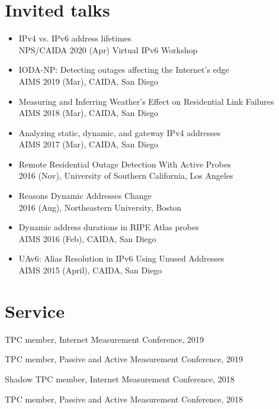 \section*{Invited talks}
\label{sec:talks}
\begin{itemize}
 \setlength\itemsep{0em}

\item IPv4 vs. IPv6 address lifetimes \\
  NPS/CAIDA 2020 (Apr) Virtual IPv6 Workshop \\
 
\item IODA-NP: Detecting outages affecting the Internet's edge \\
  AIMS 2019 (Mar), CAIDA, San Diego \\
  
\item Measuring and Inferring Weather's Effect on Residential Link Failures \\
  AIMS 2018 (Mar), CAIDA, San Diego \\

\item Analyzing static, dynamic, and gateway IPv4 addresses \\
  AIMS 2017 (Mar), CAIDA, San Diego \\

\item Remote Residential Outage Detection With Active Probes \\
2016 (Nov), University of Southern California, Los Angeles \\

\item Reasons Dynamic Addresses Change \\
2016 (Aug), Northeastern University, Boston \\

\item Dynamic address durations in RIPE Atlas probes \\
  AIMS 2016 (Feb), CAIDA, San Diego \\

\item UAv6: Alias Resolution in IPv6 Using Unused Addresses \\
  AIMS 2015 (April), CAIDA, San Diego \\

\end{itemize}


\section*{Service}
\label{sec:serv}
\begin{itemize*}
\item TPC member, Internet Measurement Conference, 2019  
\item TPC member, Passive and Active Measurement Conference, 2019
\item Shadow TPC member, Internet Measurement Conference, 2018
\item TPC member, Passive and Active Measurement Conference, 2018
\end{itemize*}



